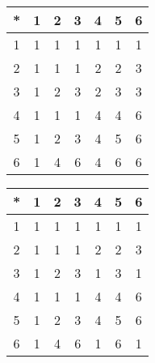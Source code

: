 \begin{tabular}[t]{c|cccccc}
*&1&2&3&4&5&6 \\ \hline
    1&1&1&1&1&1&1 \\
    2&1&1&1&2&2&3 \\
    3&1&2&3&2&3&3 \\
    4&1&1&1&4&4&6 \\
    5&1&2&3&4&5&6 \\
    6&1&4&6&4&6&6 
\end{tabular}


\begin{tabular}[t]{c|cccccc}
*&1&2&3&4&5&6 \\ \hline
    1&1&1&1&1&1&1 \\
    2&1&1&1&2&2&3 \\
    3&1&2&3&1&3&1 \\
    4&1&1&1&4&4&6 \\
    5&1&2&3&4&5&6 \\
    6&1&4&6&1&6&1 
\end{tabular}



